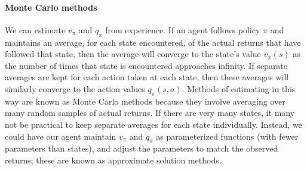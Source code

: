 \documentclass[12pt]{article}
\begin{document}
\paragraph{Monte Carlo methods} We can estimate $v_\pi$ and $q_\pi$ from experience. If an agent follows policy $\pi$ and maintains an average, for each state encountered, of the actual returns that have followed that state, then the average will converge to the state's value $v_\pi(s)$ as the number of times that state is encountered approaches infinity. If separate averages are kept for each action taken at each state, then these averages will similarly converge to the action values $q_\pi(s,a)$. Methods of estimating in this way are known as Monte Carlo methods because they involve averaging over many random samples of actual returns. If there are very many states, it many not be practical to keep separate averages for each state individually. Instead, we could have our agent maintain $v_\pi$ and $q_\pi$ as parameterized functions (with fewer parameters than states), and adjust the parameters to match the observed returns; these are known as approximate solution methods.
\end{document}
